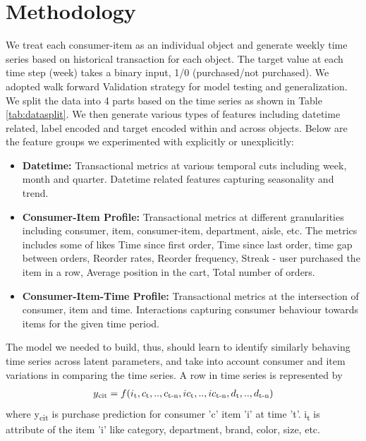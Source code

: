 \section{Methodology}
We treat each consumer-item as an individual object and generate weekly time series based on historical transaction for 
each object. The target value at each time step (week) takes a binary input, 1/0 (purchased/not purchased).
We adopted walk forward Validation strategy for model testing and generalization. We split the data into 4 parts
based on the time series as shown in Table \ref{tab:datasplit}.
We then generate various types of features including datetime related, label encoded and target encoded 
within and across objects. Below are the feature groups we experimented with explicitly or unexplicitly:
\begin{itemize}
\item {\bf Datetime:} Transactional metrics at various temporal cuts including week, month and quarter. 
Datetime related features capturing seasonality and trend.
\item {\bf Consumer-Item Profile:} Transactional metrics at different granularities including consumer, item,
consumer-item, department, aisle, etc. The metrics includes some of likes Time since first order, 
Time since last order, time gap between orders, Reorder rates, Reorder frequency, 
Streak - user purchased the item in a row, Average position in the cart, Total number of orders.
\item {\bf Consumer-Item-Time Profile:} Transactional metrics at the intersection of consumer, item and time.
Interactions capturing consumer behaviour towards items for the given time period.
\end{itemize}
The model we needed to build, thus, should learn to identify similarly behaving time series across latent
parameters, and take into account consumer and item variations in comparing the time series. A row in time series 
is represented by
  \begin{equation}
    \begin{array}{l}
      y\textsubscript{cit}  = f(i\textsubscript{t}, c\textsubscript{t},..,c\textsubscript{t-n}, ic\textsubscript{t}
      ,..,ic\textsubscript{t-n}, d\textsubscript{t},..,d\textsubscript{t-n})
    \end{array}
    \label{eqn:fx}
  \end{equation}
where y\textsubscript{cit} is purchase prediction for consumer 'c' item ’i’ at time ’t’. 
i\textsubscript{t} is attribute of the item ’i’ like category, department, brand, color, size, etc. 
